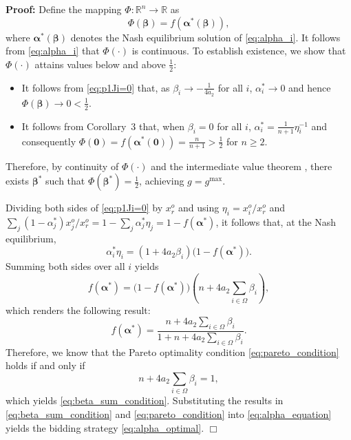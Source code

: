 \documentclass[journal]{IEEEtran}
\begin{document}
\noindent\textbf{Proof:} Define the mapping $\Phi: \mathbb{R}^n \to \mathbb{R}$ as \[ \Phi(\boldsymbol{\beta}) = f(\boldsymbol{\alpha}^*(\boldsymbol{\beta})), \] 
where $\boldsymbol{\alpha}^*(\boldsymbol{\beta})$ denotes the Nash equilibrium solution of \eqref{eq:alpha_i}. It follows from \eqref{eq:alpha_i} that $\Phi(\cdot)$ is continuous. To establish existence, we show that $\Phi(\cdot)$ attains values below and above $\frac{1}{2}$:
\begin{itemize}
\item It follows from \eqref{eq:p1Ji=0} that, as $\beta_i \to -\frac{1}{4a_2}$ for all $i$, $\alpha_i^* \to 0$ and hence $\Phi(\boldsymbol{\beta}) \to 0 < \frac{1}{2}$. 
\item It follows from Corollary~3 that, when $\beta_i = 0$ for all $i$, $\alpha_i^* = \tfrac{1}{n+1}\eta_i^{-1}$ and consequently $\Phi(\boldsymbol{0}) = f(\boldsymbol{\alpha}^*(\boldsymbol{0})) = \tfrac{n}{n+1} > \frac{1}{2}$ for $n \geq 2$.
\end{itemize}
Therefore, by continuity of $\Phi(\cdot)$ and the intermediate value theorem \cite{rudin}, there exists $\boldsymbol{\beta}^*$ such that $\Phi(\boldsymbol{\beta}^*) = \frac{1}{2}$, achieving $g = g^{\max}$. 

Dividing both sides of \eqref{eq:p1Ji=0} by $x_r^o$ and using $\eta_i = x_i^o/x_r^o$ and $\sum_j(1-\alpha_j^*)x_j^o/x_r^o = 1 - \sum_j\alpha_j^*\eta_j = 1-f(\boldsymbol{\alpha}^*)$, it follows that, at the Nash equilibrium,
\begin{equation}
    \alpha_i^* \eta_i
= (1+4a_2\beta_i)\bigl(1-f(\boldsymbol{\alpha}^\ast)\bigr). \label{eq:alpha_equation}
\end{equation}
Summing both sides over all $i$ yields
\[ f(\boldsymbol{\alpha}^\ast)
= \bigl(1-f(\boldsymbol{\alpha}^\ast)\bigr)
\left(n + 4a_2\sum_{i\in\Omega} \beta_i\right),
\]
which renders the following result:
\[
f(\boldsymbol{\alpha}^\ast)
= \frac{n + 4a_2\sum_{i\in\Omega} \beta_i}{1 + n + 4a_2\sum_{i\in\Omega} \beta_i}.
\]
Therefore, we know that the Pareto optimality condition \eqref{eq:pareto_condition} holds if and
only if
\[
n + 4a_2\sum_{i\in\Omega} \beta_i = 1,
\]
which yields \eqref{eq:beta_sum_condition}. Substituting the results in \eqref{eq:beta_sum_condition} and \eqref{eq:pareto_condition} into \eqref{eq:alpha_equation} yields the bidding strategy \eqref{eq:alpha_optimal}.
\hfill $\Box$
\end{document}

